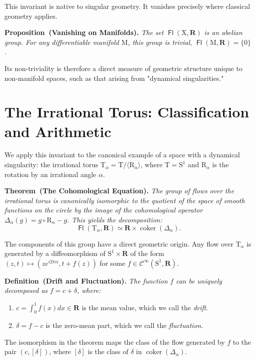 \documentclass[10pt,letterpaper,reqno]{amsart}
\newenvironment{definition}[1]%
{\noindent\textbf{Definition#1.} \it}%
{}
\newenvironment{proposition}[1]%
{\noindent\textbf{Proposition#1.} \it}%
{}
\newenvironment{theorem}[1]%
{\noindent\textbf{Theorem#1.} \it}%
{}
\newcommand{\RR}{\mathbf{R}}
\newcommand{\T}{\mathrm{T}}
\newcommand{\SOne}{\mathrm{S}^1}
\newcommand{\M}{\mathrm{M}}
\newcommand{\R}{\mathrm{R}}
\newcommand{\X}{\mathrm{X}}
\newcommand{\Cinfty}{\mathcal{C}^\infty}
\DeclareMathOperator{\Fb}{\boldsymbol{\mathsf{Fl}}}
\newcommand{\coker}{\operatorname{coker}}
\newcommand{\cl}[1]{\left[ #1 \right]}
\begin{document}
  This invariant is native to singular geometry. It vanishes precisely where classical geometry applies.
  
  \begin{proposition}{~(Vanishing on Manifolds)}
    The set $\Fb(\X, \RR)$ is an abelian group. For any differentiable manifold $\M$, this group is trivial, $\Fb(\M, \RR) = \{0\}$.
  \end{proposition}
  
  Its non-triviality is therefore a direct measure of geometric structure unique to non-manifold spaces, such as that arising from "dynamical singularities."
  
  
  \section{The Irrational Torus: Classification and Arithmetic}
  
  We apply this invariant to the canonical example of a space with a dynamical singularity:
  the irrational torus $\T_\alpha = \T/\langle \R_\alpha \rangle$, where $\T = \SOne$ and $\R_\alpha$ is the rotation by an irrational angle $\alpha$.
  
  \begin{theorem}{~(The Cohomological Equation)}
    The group of flows over the irrational torus is canonically isomorphic to the quotient of the space of smooth functions on the circle by the image of the cohomological operator $\Delta_\alpha(g) = g \circ \R_\alpha - g$.
    This yields the decomposition:
    $$
      \Fb(\T_\alpha, \RR) \simeq \RR \times \coker(\Delta_\alpha).
      $$
  \end{theorem}
  
  The components of this group have a direct geometric origin.
  Any flow over $\T_\alpha$ is generated by a diffeomorphism of $\SOne \times \RR$ of the form $(z,t) \mapsto (z e^{i2\pi\alpha}, t + f(z))$ for some $f \in \Cinfty(\SOne, \RR)$.
  
  \begin{definition}{~(Drift and Fluctuation)}
    The function $f$ can be uniquely decomposed as $f = c + \delta$, where:
    \begin{enumerate}
      \item $c = \int_0^1 f(x) dx \in \RR$ is the mean value, which we call the \emph{drift}.
      \item $\delta = f - c$ is the zero-mean part, which we call the \emph{fluctuation}.
    \end{enumerate}
    The isomorphism in the theorem maps the class of the flow generated by $f$ to the pair $(c, \cl{\delta})$,
    where $\cl{\delta}$ is the class of $\delta$ in $\coker(\Delta_\alpha)$.
  \end{definition}
  
\end{document}
